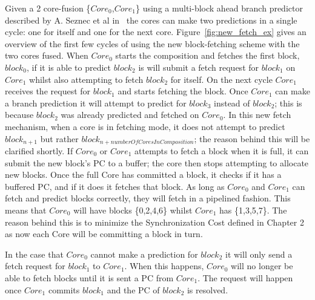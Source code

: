 Given a 2 core-fusion \{$Core_0$,$Core_1$\} using a multi-block ahead branch predictor described by A. Seznec et al in~\cite{SeseznecMultipleBlock} the cores can make two predictions in a single cycle: one for itself and one for the next core.
Figure~\ref{fig:new_fetch_ex} gives an overview of the first few cycles of using the new block-fetching scheme with the two cores fused.
When $Core_0$ starts the composition and fetches the first block, $block_0$, if it is able to predict $block_2$ is will submit a fetch request for $block_1$ on $Core_1$ whilst also attempting to fetch $block_2$ for itself.
On the next cycle $Core_1$ receives the request for $block_1$ and starts fetching the block.
Once $Core_1$ can make a branch prediction it will attempt to predict for $block_3$ instead of $block_2$; this is because $block_2$ was already predicted and fetched on $Core_0$.
In this new fetch mechanism, when a core is in fetching mode, it does not attempt to predict $block_{n+1}$ but rather $block_{n+numberOfCoresInComposition}$; the reason behind this will be clarified shortly.
If $Core_0$ or $Core_1$ attempts to fetch a block when it is full, it can submit the new block's PC to a buffer; the core then stops attempting to allocate new blocks.
Once the full Core has committed a block, it checks if it has a buffered PC, and if it does it fetches that block.
As long as $Core_0$ and $Core_1$ can fetch and predict blocks correctly, they will fetch in a pipelined fashion.
This means that $Core_0$ will have blocks \{0,2,4,6\} whilst $Core_1$ has \{1,3,5,7\}.
The reason behind this is to minimize the Synchronization Cost defined in Chapter 2 as now each Core will be committing a block in turn.

In the case that $Core_0$ cannot make a prediction for $block_2$ it will only send a fetch request for $block_1$ to $Core_1$.
When this happens, $Core_0$ will no longer be able to fetch blocks until it is sent a PC from $Core_1$.
The request will happen once $Core_1$ commits $block_1$ and the PC of $block_2$ is resolved.

